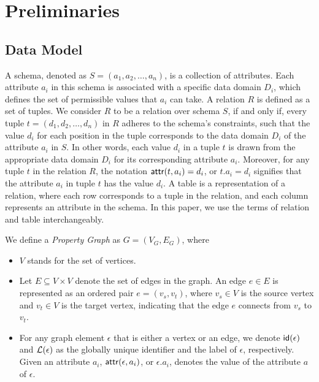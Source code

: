\section{Preliminaries}
\label{sec:preliminaries}

\subsection{Data Model}
\label{sec:data-model}

A schema, denoted as \(S = (a_1, a_2, \ldots, a_n)\), is a collection of attributes. Each attribute \(a_i\) in this schema is associated with a specific data domain \(D_i\), which defines the set of permissible values that \(a_i\) can take.
A relation \(R\) is defined as a set of tuples. We consider \(R\) to be a relation over schema \(S\), if and only if, every tuple \(t = (d_1, d_2, \ldots, d_n)\) in \(R\) adheres to the schema's constraints, such that the value \(d_i\) for each position in the tuple corresponds to the data domain \(D_i\) of the attribute \(a_i\) in \(S\). In other words, each value \(d_i\) in a tuple \(t\) is drawn from the appropriate data domain \(D_i\) for its corresponding attribute \(a_i\).
Moreover, for any tuple \(t\) in the relation \(R\), the notation \({\mathsf{attr}}(t, a_i) = d_i\), or \(t.a_i = d_i\) signifies that the attribute \(a_i\) in tuple \(t\) has the value \(d_i\). A table is a representation of a relation, where each row corresponds to a tuple in the relation, and each column represents an attribute in the schema. In this paper, we use the terms of relation and table interchangeably.

We define a \emph{Property Graph} as $G = (V_G, E_G)$,
where
\begin{itemize}
    \item $V$ stands for the set of vertices.
    \item Let $E \subseteq V \times V$ denote the set of edges in the graph. An edge $e \in E$ is represented as an ordered pair $e = (v_s, v_t)$, where $v_s \in V$ is the source vertex and $v_t \in V$ is the target vertex, indicating that the edge $e$ connects from $v_s$ to $v_t$.
    \item For any graph element $\epsilon$ that is either a vertex or an edge, we denote ${\mathsf{id}}(\epsilon)$ and $\mathcal{L}(\epsilon)$ as the globally unique identifier and the label of $\epsilon$, respectively. Given an attribute $a_i$, ${\mathsf{attr}}(\epsilon, a_i)$, or $\epsilon.a_i$, denotes the value of the attribute $a$ of $\epsilon$.
\end{itemize}


